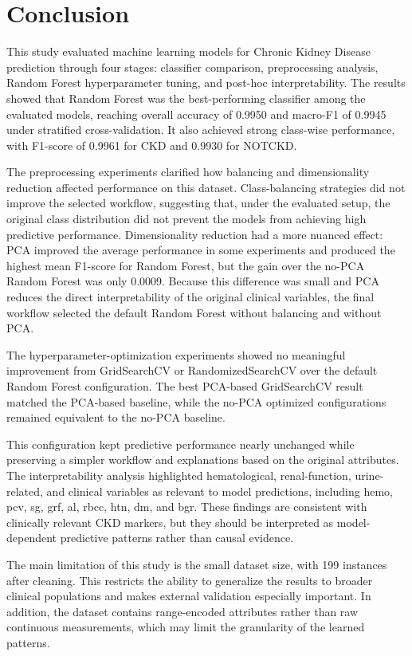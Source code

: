 \section{Conclusion}

This study evaluated machine learning models for Chronic Kidney Disease
prediction through four stages: classifier comparison, preprocessing analysis,
Random Forest hyperparameter tuning, and post-hoc interpretability. The results
showed that Random Forest was the best-performing classifier among the evaluated
models, reaching overall accuracy of 0.9950 and macro-F1 of 0.9945 under
stratified cross-validation. It also achieved strong class-wise performance,
with F1-score of 0.9961 for CKD and 0.9930 for NOTCKD.

The preprocessing experiments clarified how balancing and dimensionality
reduction affected performance on this dataset. Class-balancing strategies did
not improve the selected workflow, suggesting that, under the evaluated setup,
the original class distribution did not prevent the models from achieving high
predictive performance. Dimensionality reduction had a more nuanced effect: PCA
improved the average performance in some experiments and produced the highest
mean F1-score for Random Forest, but the gain over the no-PCA Random Forest was
only 0.0009. Because this difference was small and PCA reduces the direct
interpretability of the original clinical variables, the final workflow selected
the default Random Forest without balancing and without PCA.

The hyperparameter-optimization experiments showed no meaningful improvement
from GridSearchCV or RandomizedSearchCV over the default Random Forest
configuration. The best PCA-based GridSearchCV result matched the PCA-based
baseline, while the no-PCA optimized configurations remained equivalent to the
no-PCA baseline.

This configuration kept predictive performance nearly unchanged while
preserving a simpler workflow and explanations based on the original attributes.
The interpretability analysis highlighted hematological, renal-function,
urine-related, and clinical variables as relevant to model predictions,
including hemo, pcv, sg, grf, al, rbcc, htn, dm, and bgr. These findings are
consistent with clinically relevant CKD markers, but they should be interpreted
as model-dependent predictive patterns rather than causal evidence.

The main limitation of this study is the small dataset size, with 199 instances
after cleaning. This restricts the ability to generalize the results to broader
clinical populations and makes external validation especially important. In
addition, the dataset contains range-encoded attributes rather than raw
continuous measurements, which may limit the granularity of the learned
patterns.

